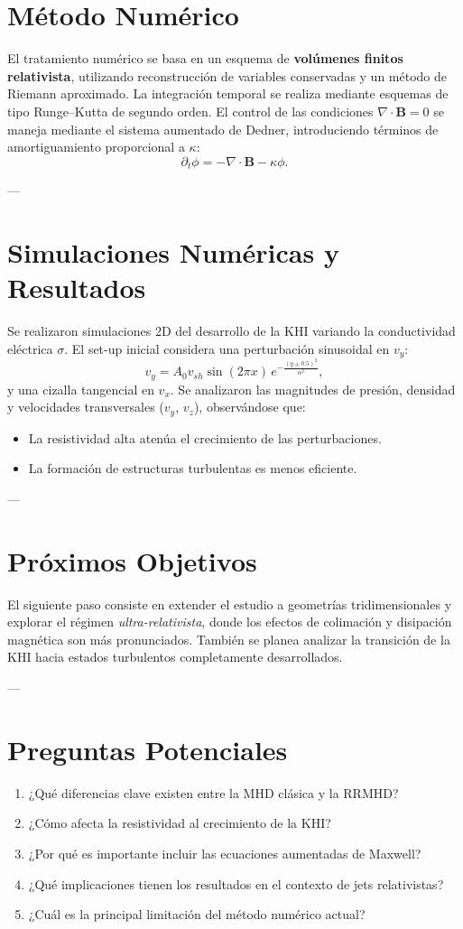 \section{Método Numérico}
El tratamiento numérico se basa en un esquema de \textbf{volúmenes finitos relativista}, utilizando reconstrucción de variables conservadas y un método de Riemann aproximado.  
La integración temporal se realiza mediante esquemas de tipo Runge–Kutta de segundo orden.  
El control de las condiciones $\nabla \cdot \mathbf{B}=0$ se maneja mediante el sistema aumentado de Dedner, introduciendo términos de amortiguamiento proporcional a $\kappa$:
\[
\partial_t \phi = -\nabla\cdot \mathbf{B} - \kappa \phi.
\]

---

\section{Simulaciones Numéricas y Resultados}
Se realizaron simulaciones 2D del desarrollo de la KHI variando la conductividad eléctrica $\sigma$.  
El set-up inicial considera una perturbación sinusoidal en $v_y$:
\[
v_y = A_0 v_{sh} \sin(2\pi x)\, e^{-\frac{(y\pm 0.5)^2}{\alpha^2}},
\]
y una cizalla tangencial en $v_x$.  
Se analizaron las magnitudes de presión, densidad y velocidades transversales ($v_y$, $v_z$), observándose que:
\begin{itemize}
    \item La resistividad alta atenúa el crecimiento de las perturbaciones.
    \item La formación de estructuras turbulentas es menos eficiente.
\end{itemize}

---

\section{Próximos Objetivos}
El siguiente paso consiste en extender el estudio a geometrías tridimensionales y explorar el régimen \textit{ultra-relativista}, donde los efectos de colimación y disipación magnética son más pronunciados.  
También se planea analizar la transición de la KHI hacia estados turbulentos completamente desarrollados.

---

\section{Preguntas Potenciales}
\begin{enumerate}
    \item ¿Qué diferencias clave existen entre la MHD clásica y la RRMHD?
    \item ¿Cómo afecta la resistividad al crecimiento de la KHI?
    \item ¿Por qué es importante incluir las ecuaciones aumentadas de Maxwell?
    \item ¿Qué implicaciones tienen los resultados en el contexto de jets relativistas?
    \item ¿Cuál es la principal limitación del método numérico actual?
\end{enumerate}
